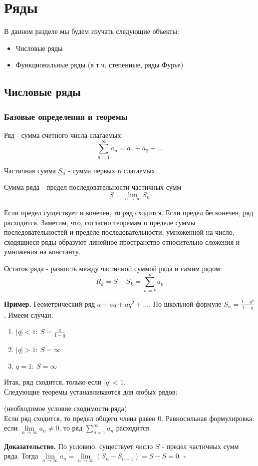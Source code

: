 \chapter{Ряды}
В данном разделе мы будем изучать следующие объекты:
\begin{itemize}
    \item Числовые ряды
    \item Функциональные ряды (в т.ч. степенные, ряды Фурье)
\end{itemize}

\section{Числовые ряды}
\subsection{Базовые определения и теоремы}
\begin{defin}
Ряд - сумма счетного числа слагаемых: $$\sum_{n=1}^{\infty} a_n =a_1+a_2+
\ldots$$
\end{defin}
\begin{defin}
Частичная сумма $S_n$ - сумма первых n слагаемых
\end{defin}
\begin{defin}
Сумма ряда - предел последовательности частичных сумм 
$$S=\lim\limits_{n \to \infty}S_n$$
\end{defin}
Если предел существует и конечен, то ряд сходится. Если предел бесконечен, ряд 
расходится. Заметим, что, согласно теоремам о пределе суммы последовательностей
и пределе последовательности, умноженной на число, сходящиеся ряды образуют
линейное пространство относительно сложения и умножения на константу.
\begin{defin}
Остаток ряда - разность между частичной суммой ряда и самим рядом: 
$$R_k=S-S_k=\sum_{n=k}^{\infty} a_k$$
\end{defin}
\textbf{Пример.} Геометрический ряд $a+aq+aq^2+\ldots$. По школьной 
формуле $S_n=\frac{1-q^n}{1-q}$. Имеем случаи:
\begin{enumerate}
    \item $|q|<1:~S=\frac{a}{1-q}$ 
    \item $|q|>1:~S=\infty$
    \item $q=1:~S=\infty$
\end{enumerate}
Итак, ряд сходится, только если $|q|<1$.\\
Следующие теоремы устанавливаются для любых рядов:
\begin{theor}(необходимое условие сходимости ряда)\\
Если ряд сходится, то предел общего члена равен 0.
Равносильная формулировка: если
$\lim\limits_{n\to\infty} a_n\ne0$, то ряд $\sum\limits_{n=1}^{\infty} a_n $
расходится.
\end{theor}
\textbf{Доказательство.} По условию, существует число $S$ - предел частичных 
сумм ряда.
Тогда $\lim\limits_{n \to \infty}a_n=\lim\limits_{n \to \infty}(S_{n}-S_{n-1})
=S-S=0$. 
$\square$

